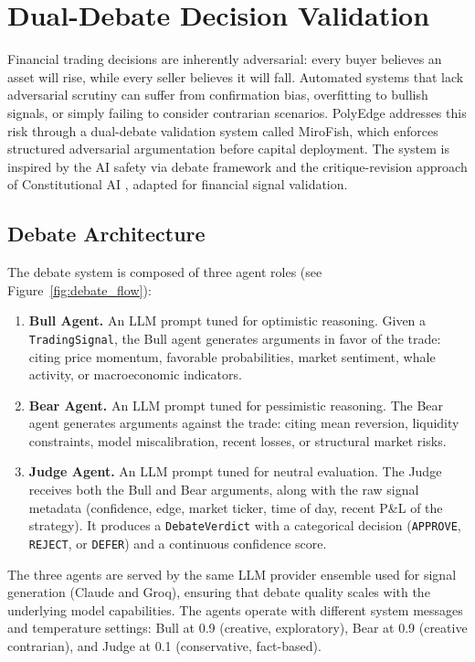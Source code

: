 \section{Dual-Debate Decision Validation}\label{sec:debate}

Financial trading decisions are inherently adversarial: every buyer believes an asset will rise, while every seller believes it will fall. Automated systems that lack adversarial scrutiny can suffer from confirmation bias, overfitting to bullish signals, or simply failing to consider contrarian scenarios. PolyEdge addresses this risk through a dual-debate validation system called MiroFish, which enforces structured adversarial argumentation before capital deployment. The system is inspired by the AI safety via debate framework \citep{irving2018ai} and the critique-revision approach of Constitutional AI \citep{bai2022constitutional}, adapted for financial signal validation.

\subsection{Debate Architecture}

The debate system is composed of three agent roles (see Figure~\ref{fig:debate_flow}):

\begin{enumerate}
    \item \textbf{Bull Agent.} An LLM prompt tuned for optimistic reasoning. Given a \texttt{TradingSignal}, the Bull agent generates arguments in favor of the trade: citing price momentum, favorable probabilities, market sentiment, whale activity, or macroeconomic indicators.
    \item \textbf{Bear Agent.} An LLM prompt tuned for pessimistic reasoning. The Bear agent generates arguments against the trade: citing mean reversion, liquidity constraints, model miscalibration, recent losses, or structural market risks.
    \item \textbf{Judge Agent.} An LLM prompt tuned for neutral evaluation. The Judge receives both the Bull and Bear arguments, along with the raw signal metadata (confidence, edge, market ticker, time of day, recent P\&L of the strategy). It produces a \texttt{DebateVerdict} with a categorical decision (\texttt{APPROVE}, \texttt{REJECT}, or \texttt{DEFER}) and a continuous confidence score.
\end{enumerate}

The three agents are served by the same LLM provider ensemble used for signal generation (Claude and Groq), ensuring that debate quality scales with the underlying model capabilities. The agents operate with different system messages and temperature settings: Bull at 0.9 (creative, exploratory), Bear at 0.9 (creative contrarian), and Judge at 0.1 (conservative, fact-based).

